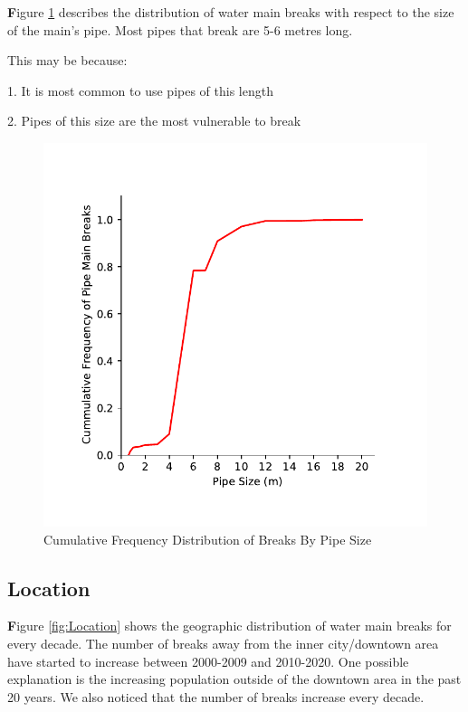 \documentclass[twocolumn]{article}
\begin{document}
\textbf Figure \ref{fig:Pipe Size} describes the distribution of water main breaks with respect to the size of the main's pipe. Most pipes that break are 5-6 metres long.

This may be because:

1.	It is most common to use pipes of this length

2.	Pipes of this size are the most vulnerable to break


\begin{figure}[H]
    
    \includegraphics[width=\columnwidth]{Gautam/size_cdf.pdf}
    \caption{ Cumulative Frequency Distribution of Breaks By Pipe Size}
    \label{fig:Pipe Size}
\end{figure}

\subsection{Location}

\textbf Figure \ref{fig:Location} shows the geographic distribution of water main breaks for every decade. The number of breaks away from the inner city/downtown area have started to increase between 2000-2009 and 2010-2020. One possible explanation is the increasing population outside of the downtown area in the past 20 years. We also noticed that the number of breaks increase every decade.
\end{document}

